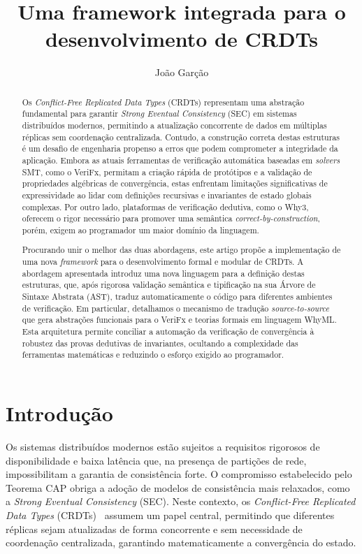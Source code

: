 \documentclass{llncs}
\title{Uma framework integrada para o desenvolvimento de CRDTs}
\author{João Garção}
\institute{Universidade NOVA de Lisboa \& NOVA Lincs}
\begin{document}
\maketitle

\begin{abstract}
Os \textit{Conflict-Free Replicated Data Types} (CRDTs) representam uma abstração fundamental para garantir \textit{Strong Eventual Consistency} (SEC)
em sistemas distribuídos modernos, permitindo a atualização concorrente de dados em múltiplas réplicas sem coordenação centralizada.
Contudo, a construção correta destas estruturas é um desafio de engenharia propenso a erros que podem comprometer a integridade da aplicação.
Embora as atuais ferramentas de verificação automática baseadas em \textit{solvers} SMT, como o VeriFx,
permitam a criação rápida de protótipos e a validação de propriedades algébricas de convergência,
estas enfrentam limitações significativas de expressividade ao lidar com definições recursivas e invariantes de estado globais complexas.
Por outro lado, plataformas de verificação dedutiva, como o Why3, oferecem o rigor necessário para promover uma semântica \textit{correct-by-construction},
porém, exigem ao programador um maior domínio da linguagem.

Procurando unir o melhor das duas abordagens, este artigo propõe a implementação de uma nova \textit{framework} para o desenvolvimento formal e modular de CRDTs.
A abordagem apresentada introduz uma nova linguagem para a definição destas estruturas, que,
após rigorosa validação semântica e tipificação na sua Árvore de Sintaxe Abstrata (AST),
traduz automaticamente o código para diferentes ambientes de verificação. Em particular,
detalhamos o mecanismo de tradução \textit{source-to-source} que gera abstrações funcionais para o VeriFx e teorias formais em linguagem WhyML.
Esta arquitetura permite conciliar a automação da verificação de convergência à robustez das provas dedutivas de invariantes,
ocultando a complexidade das ferramentas matemáticas e reduzindo o esforço exigido ao programador.

\end{abstract}

\section{Introdução}

Os sistemas distribuídos modernos estão sujeitos a requisitos rigorosos de disponibilidade e baixa latência que, na presença de partições de rede,
impossibilitam a garantia de consistência forte. O compromisso estabelecido pelo Teorema CAP obriga a adoção de modelos de consistência mais relaxados,
como a \textit{Strong Eventual Consistency} (SEC). Neste contexto, os \textit{Conflict-Free Replicated Data Types} (CRDTs)~\cite{shapiro2011comprehensive} assumem um papel central,
permitindo que diferentes réplicas sejam atualizadas de forma concorrente e sem necessidade de coordenação centralizada, garantindo matematicamente a convergência do estado.
\end{document}
